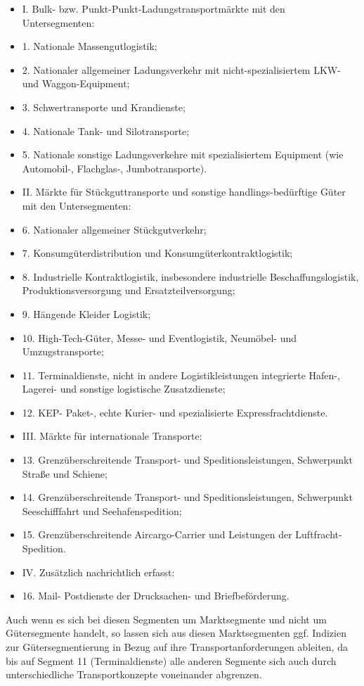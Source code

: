 \begin{itemize}
%
   \item I. Bulk- bzw. Punkt-Punkt-Ladungstransportmärkte mit den Untersegmenten:
   \item 1. Nationale Massengutlogistik;
   \item 2. Nationaler allgemeiner Ladungsverkehr mit nicht-spezialisiertem LKW- und Waggon-Equipment;
   \item 3. Schwertransporte und Krandienste;
   \item 4. Nationale Tank- und Silotransporte;
   \item 5. Nationale sonstige Ladungsverkehre mit spezialisiertem Equipment (wie Automobil-, Flachglas-, Jumbotransporte).
   \item II. Märkte für Stückguttransporte und sonstige handlings-bedürftige Güter mit den Untersegmenten:
   \item 6. Nationaler allgemeiner Stückgutverkehr;
   \item 7. Konsumgüterdistribution und Konsumgüterkontraktlogistik;
   \item 8. Industrielle Kontraktlogistik, insbesondere industrielle Beschaffungslogistik, Produktionsversorgung und Ersatzteilversorgung;
   \item 9. Hängende Kleider Logistik;
   \item 10. High-Tech-Güter, Messe- und Eventlogistik, Neumöbel- und Umzugstransporte;
   \item 11. Terminaldienste, nicht in andere Logistikleistungen integrierte Hafen-, Lagerei- und sonstige logistische Zusatzdienste;  
   \item 12. KEP- Paket-, echte Kurier- und spezialisierte Expressfrachtdienste.
   \item III. Märkte für internationale Transporte:
   \item 13. Grenzüberschreitende Transport- und Speditionsleistungen, Schwerpunkt Straße und Schiene;
   \item 14. Grenzüberschreitende Transport- und Speditionsleistungen, Schwerpunkt Seeschifffahrt und Seehafenspedition;
   \item 15. Grenzüberschreitende Aircargo-Carrier und Leistungen der Luftfracht- Spedition.
   \item IV. Zusätzlich nachrichtlich erfasst:
   \item 16. Mail- Postdienste der Drucksachen- und Briefbeförderung.
%
\end{itemize}
Auch wenn es sich bei diesen Segmenten um Marktsegmente und nicht um Gütersegmente handelt, so lassen sich aus diesen Marktsegmenten ggf. Indizien zur Gütersegmentierung in Bezug auf ihre Transportanforderungen ableiten, da bis auf Segment 11 (Terminaldienste) alle anderen Segmente sich auch durch unterschiedliche Transportkonzepte voneinander abgrenzen.~\\


